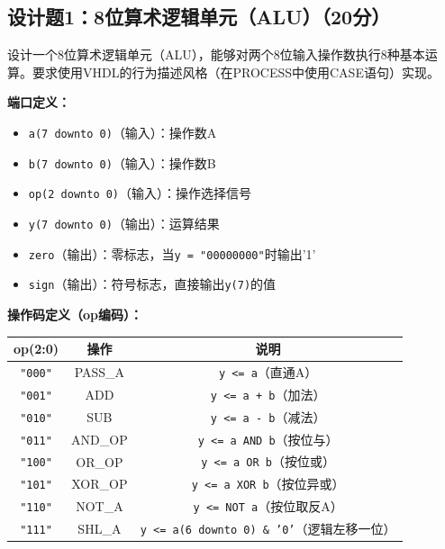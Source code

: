 \subsection*{设计题1：8位算术逻辑单元（ALU）（20分）}

设计一个8位算术逻辑单元（ALU），能够对两个8位输入操作数执行8种基本运算。要求使用VHDL的行为描述风格（在PROCESS中使用CASE语句）实现。

\vspace{0.3cm}

\textbf{端口定义：}
\begin{itemize}
  \item \texttt{a(7 downto 0)}（输入）：操作数A
  \item \texttt{b(7 downto 0)}（输入）：操作数B
  \item \texttt{op(2 downto 0)}（输入）：操作选择信号
  \item \texttt{y(7 downto 0)}（输出）：运算结果
  \item \texttt{zero}（输出）：零标志，当\texttt{y = "00000000"}时输出'1'
  \item \texttt{sign}（输出）：符号标志，直接输出\texttt{y(7)}的值
\end{itemize}

\vspace{0.3cm}

\textbf{操作码定义（op编码）：}
\begin{center}
\begin{tabular}{|c|c|c|}
\hline
\textbf{op(2:0)} & \textbf{操作} & \textbf{说明} \\
\hline
\texttt{"000"} & PASS\_A & \texttt{y <= a}（直通A）\\
\texttt{"001"} & ADD & \texttt{y <= a + b}（加法）\\
\texttt{"010"} & SUB & \texttt{y <= a - b}（减法）\\
\texttt{"011"} & AND\_OP & \texttt{y <= a AND b}（按位与）\\
\texttt{"100"} & OR\_OP & \texttt{y <= a OR b}（按位或）\\
\texttt{"101"} & XOR\_OP & \texttt{y <= a XOR b}（按位异或）\\
\texttt{"110"} & NOT\_A & \texttt{y <= NOT a}（按位取反A）\\
\texttt{"111"} & SHL\_A & \texttt{y <= a(6 downto 0) \& '0'}（逻辑左移一位）\\
\hline
\end{tabular}
\end{center}

